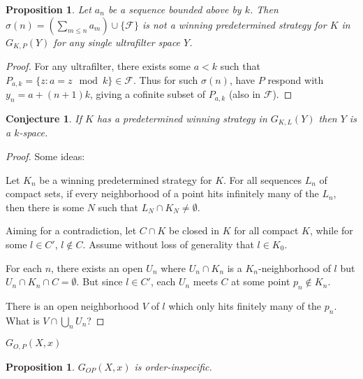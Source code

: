 \documentclass[11pt]{article}
\theoremstyle{plain}
\newtheorem{proposition}[theorem]{Proposition}
\newtheorem{conjecture}[theorem]{Conjecture}
\theoremstyle{definition}
\theoremstyle{remark}
\begin{document}
\begin{proposition}
Let $a_n$ be a sequence bounded above by $k$. Then $\sigma(n)=(\sum_{m\leq n} a_m )\cup \{\mathcal{F}\}$ is not a winning predetermined strategy for $K$ in $G_{K,P}(Y)$ for any single ultrafilter space $Y$.
\end{proposition}

\begin{proof}
For any ultrafilter, there exists some $a<k$ such that $P_{a,k}=\{z : a = z\mod k\} \in \mathcal{F}$. Thus for such $\sigma(n)$, have $P$ respond with $y_n = a + (n+1)k$, giving a cofinite subset of $P_{a,k}$ (also in $\mathcal{F}$).
\end{proof}


\begin{conjecture}
If $K$ has a predetermined winning strategy in $G_{K,L}(Y)$ then $Y$ is a $k$-space.
\end{conjecture}

\begin{proof}
Some ideas:

Let $K_n$ be a winning predetermined strategy for $K$. For all sequences $L_n$ of compact sets, if every neighborhood of a point hits infinitely many of the $L_n$, then there is some $N$ such that $L_N \cap K_N \not= \emptyset$.

Aiming for a contradiction, let $C \cap K$ be closed in $K$ for all compact $K$, while for some $l\in C'$, $l \not\in C$. Assume without loss of generality that $l\in K_0$.

For each $n$, there exists an open $U_n$ where $U_n \cap K_n$ is a $K_n$-neighborhood of $l$ but $U_n \cap K_n \cap C = \emptyset$. But since $l\in C'$, each $U_n$ meets $C$ at some point $p_n \not\in K_n$.

There is an open neighborhood $V$ of $l$ which only hits finitely many of the $p_n$. What is $V \cap \bigcup_n U_n$?
\end{proof}








\centerline{\bf $G_{O,P}(X,x)$}

\begin{proposition}
$G_{OP}(X,x)$ is order-inspecific.
\end{proposition}
\end{document}
